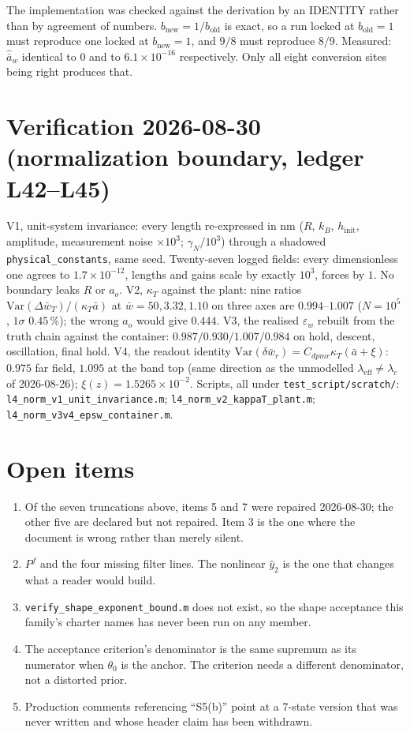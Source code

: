 \documentclass[11pt,a4paper,fontset=none]{ctexart}
\newcommand{\ba}{\bar{a}}
\newcommand{\bw}{\bar{w}}
\begin{document}
The implementation was checked against the derivation by an IDENTITY rather than
by agreement of numbers. $b_{\mathrm{new}} = 1/b_{\mathrm{old}}$ is exact, so a
run locked at $b_{\mathrm{old}} = 1$ must reproduce one locked at
$b_{\mathrm{new}} = 1$, and $9/8$ must reproduce $8/9$. Measured: $\hat{\ba}_w$
identical to $0$ and to $6.1\times10^{-16}$ respectively. Only all eight
conversion sites being right produces that.

\section*{Verification 2026-08-30 (normalization boundary, ledger L42--L45)}

V1, unit-system invariance: every length re-expressed in nm ($R$, $k_B$,
$h_{\mathrm{init}}$, amplitude, measurement noise $\times 10^{3}$;
$\gamma_N/10^{3}$) through a shadowed \texttt{physical\_constants}, same seed.
Twenty-seven logged fields: every dimensionless one agrees to $1.7\times10^{-12}$,
lengths and gains scale by exactly $10^{3}$, forces by $1$. No boundary leaks
$R$ or $a_o$. V2, $\kappa_T$ against the plant: nine ratios
$\mathrm{Var}(\Delta\bw_T)/(\kappa_T\ba)$ at $\bw = 50, 3.32, 1.10$ on three axes
are $0.994$--$1.007$ ($N = 10^{5}$, $1\sigma$ $0.45\,\%$); the wrong $a_o$ would
give $0.444$. V3, the realised $\varepsilon_w$ rebuilt from the truth chain
against the container: $0.987/0.930/1.007/0.984$ on hold, descent, oscillation,
final hold. V4, the readout identity
$\mathrm{Var}(\delta\bw_r) = C_{dpmr}\kappa_T(\ba+\xi)$: $0.975$ far field,
$1.095$ at the band top (same direction as the unmodelled
$\lambda_{\mathrm{eff}} \ne \lambda_c$ of 2026-08-26); $\xi(z) = 1.5265\times10^{-2}$.
Scripts, all under \texttt{test\_script/scratch/}:
\texttt{l4\_norm\_v1\_unit\_invariance.m};
\texttt{l4\_norm\_v2\_kappaT\_plant.m};
\texttt{l4\_norm\_v3v4\_epsw\_container.m}.

\section*{Open items}

\begin{enumerate}
\item Of the seven truncations above, items 5 and 7 were repaired 2026-08-30;
the other five are declared but not repaired. Item 3 is the one where the
document is wrong rather than merely silent.
\item $P^{f}$ and the four missing filter lines. The nonlinear
$\hat{y}_2$ is the one that changes what a reader would build.
\item \texttt{verify\_shape\_exponent\_bound.m} does not exist, so the shape
acceptance this family's charter names has never been run on any member.
\item The acceptance criterion's denominator is the same supremum as its
numerator when $\theta_0$ is the anchor. The criterion needs a different
denominator, not a distorted prior.
\item Production comments referencing ``S5(b)'' point at a 7-state version that
was never written and whose header claim has been withdrawn.
\end{enumerate}
\end{document}
